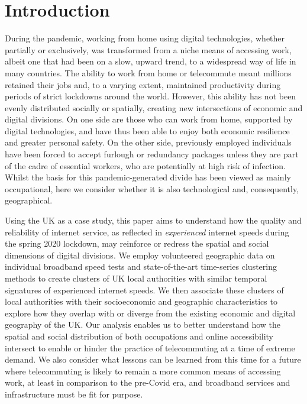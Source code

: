 \documentclass[Royal,times,sageh]{sagej}
\begin{document}
\maketitle

\hypertarget{sec:1}{%
\section{Introduction}\label{sec:1}}

During the pandemic, working from home using digital technologies,
whether partially or exclusively, was transformed from a niche means of
accessing work, albeit one that had been on a slow, upward trend, to a
widespread way of life in many countries. The ability to work from home
or telecommute meant millions retained their jobs and, to a varying
extent, maintained productivity during periods of strict lockdowns
around the world. However, this ability has not been evenly distributed
socially or spatially, creating new intersections of economic and
digital divisions. On one side are those who can work from home,
supported by digital technologies, and have thus been able to enjoy both
economic resilience and greater personal safety. On the other side,
previously employed individuals have been forced to accept furlough or
redundancy packages unless they are part of the cadre of essential
workers, who are potentially at high risk of infection. Whilst the basis
for this pandemic-generated divide has been viewed as mainly
occupational, here we consider whether it is also technological and,
consequently, geographical.

Using the UK as a case study, this paper aims to understand how the
quality and reliability of internet service, as reflected in
\emph{experienced} internet speeds during the spring 2020 lockdown, may
reinforce or redress the spatial and social dimensions of digital
divisions. We employ volunteered geographic data on individual broadband
speed tests and state-of-the-art time-series clustering methods to
create clusters of UK local authorities with similar temporal signatures
of experienced internet speeds. We then associate these clusters of
local authorities with their socioeconomic and geographic
characteristics to explore how they overlap with or diverge from the
existing economic and digital geography of the UK. Our analysis enables
us to better understand how the spatial and social distribution of both
occupations and online accessibility intersect to enable or hinder the
practice of telecommuting at a time of extreme demand. We also consider
what lessons can be learned from this time for a future where
telecommuting is likely to remain a more common means of accessing work,
at least in comparison to the pre-Covid era, and broadband services and
infrastructure must be fit for purpose.
\end{document}
